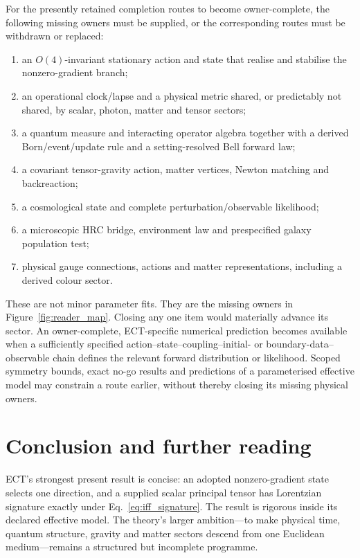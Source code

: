 \documentclass[11pt,a4paper]{article}
\begin{document}
For the presently retained completion routes to become owner-complete, the
following missing owners must be supplied, or the corresponding routes must be
withdrawn or replaced:
\begin{enumerate}[leftmargin=1.5em,itemsep=2pt]
\item an $O(4)$-invariant stationary action and state that realise and stabilise
the nonzero-gradient branch;
\item an operational clock/lapse and a physical metric shared, or predictably
not shared, by scalar, photon, matter and tensor sectors;
\item a quantum measure and interacting operator algebra together with a
derived Born/event/update rule and a setting-resolved Bell forward law;
\item a covariant tensor-gravity action, matter vertices, Newton matching and
backreaction;
\item a cosmological state and complete perturbation/observable likelihood;
\item a microscopic HRC bridge, environment law and prespecified galaxy
population test;
\item physical gauge connections, actions and matter representations,
including a derived colour sector.
\end{enumerate}

These are not minor parameter fits.  They are the missing owners in
Figure~\ref{fig:reader_map}.  Closing any one item would materially advance its
sector.  An owner-complete, ECT-specific numerical prediction becomes
available when a sufficiently specified action--state--coupling--initial- or
boundary-data--observable chain defines the relevant forward distribution or
likelihood.  Scoped symmetry bounds, exact no-go results and predictions of a
parameterised effective model may constrain a route earlier, without thereby
closing its missing physical owners.

\section{Conclusion and further reading}
\label{sec:conclusion}

ECT's strongest present result is concise: an adopted nonzero-gradient state
selects one direction, and a supplied scalar principal tensor has Lorentzian
signature exactly under Eq.~\eqref{eq:iff_signature}.  The result is rigorous
inside its declared effective model.  The theory's larger ambition---to make
physical time, quantum structure, gravity and matter sectors descend from one
Euclidean medium---remains a structured but incomplete programme.
\end{document}
